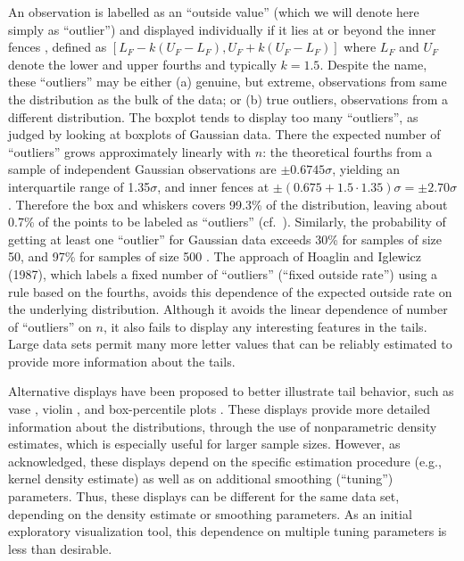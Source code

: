 \documentclass[12pt,oneside]{article}
\begin{document}
An observation is labelled as an ``outside value'' (which we will denote here
simply as ``outlier'') and displayed individually if it lies at or beyond the
inner fences \citep{eda,emerson83}, defined as $[L_F - k(U_F - L_F), U_F +
k(U_F - L_F)]$ where $L_F$ and $U_F$ denote the lower and upper fourths and
typically $k = 1.5$. Despite the name, these ``outliers'' may be either (a)
genuine, but extreme, observations from same the distribution as the bulk of
the data; or (b) true outliers, observations from a different distribution.
The boxplot tends to display too many ``outliers'', as judged by looking at
boxplots of Gaussian data. There the expected number of ``outliers'' grows
approximately linearly with $n$: the theoretical fourths from a sample of
independent Gaussian observations are $\pm 0.6745\sigma$, yielding an
interquartile range of 1.35$\sigma$, and inner fences at $\pm (0.675 + 1.5
\cdot 1.35)\sigma = \pm 2.70\sigma$. Therefore the box and whiskers covers
99.3\% of the distribution, leaving about 0.7\% of the points to be labeled as
``outliers'' (cf.~\citet{dchlv}). Similarly, the probability of getting at
least one ``outlier'' for Gaussian data exceeds 30\% for samples of size 50,
and 97\% for samples of size 500 \citep[pg. 1148]{dchbox}. The approach of Hoaglin and Iglewicz (1987), which labels a fixed
number of ``outliers'' (``fixed outside rate'') using a rule based
on the fourths, avoids this dependence of the expected outside rate on the 
underlying distribution.  Although it avoids the linear dependence of
number of ``outliers'' on $n$, it also fails to display any interesting
features in the tails.  Large data sets permit many more letter values
that can be reliably estimated to provide more information about the tails.


Alternative displays have been proposed to better illustrate tail behavior,
such as vase \citep{vase}, violin \citep{violin}, and box-percentile plots
\citep{box.percentiles}. These displays provide more detailed information
about the distributions, through the use of nonparametric density estimates,
which is especially useful for larger sample sizes. However, as \citet{vase}
acknowledged, these displays depend on the specific estimation procedure
(e.g., kernel density estimate) as well as on additional smoothing
(``tuning'') parameters. Thus, these displays can be different for the same
data set, depending on the density estimate or smoothing parameters. As an
initial exploratory visualization tool, this dependence on multiple tuning
parameters is less than desirable.
\end{document}
